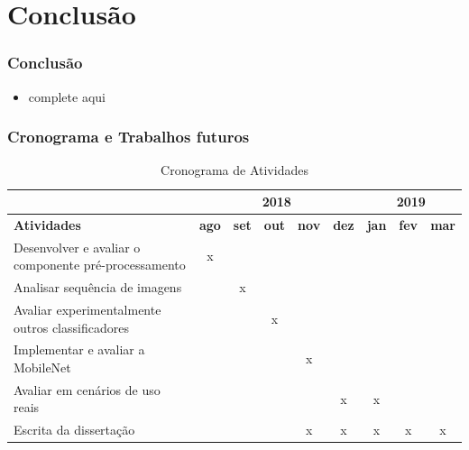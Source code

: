\documentclass{beamer}
\begin{document}


\section{Conclusão}

\begin{frame}
\frametitle{Conclusão}
\begin{itemize}
\pause
\item complete aqui
\end{itemize}
\end{frame}


\begin{frame}
 \frametitle{Cronograma e Trabalhos futuros}
 \pause
 \begin{table}[]\footnotesize
\caption{Cronograma de Atividades}
\label{table:cronog}
\begin{tabular}{l|ccccc|ccc|}
\cline{2-9}
                                                                           & \multicolumn{5}{c|}{\textbf{2018}}                                       & \multicolumn{3}{c|}{\textbf{2019}}         \\ \hline
\multicolumn{1}{|l|}{\textbf{Atividades}}                                  & \textbf{ago} & \textbf{set} & \textbf{out} & \textbf{nov} & \textbf{dez} & \textbf{jan} & \textbf{fev} & \textbf{mar} \\ \hline
\multicolumn{1}{|l|}{Desenvolver e avaliar o componente pré-processamento} & x            &              &              &              &              &              &              &              \\
\multicolumn{1}{|l|}{Analisar sequência de imagens}                        &              & x            &              &              &              &              &              &              \\
\multicolumn{1}{|l|}{Avaliar experimentalmente outros classificadores}     &              &              & x            &              &              &              &              &              \\
\multicolumn{1}{|l|}{Implementar e avaliar a MobileNet}                    &              &              &              & x            &              &              &              &              \\
\multicolumn{1}{|l|}{Avaliar em cenários de uso reais}                     &              &              &              &              & x            & x            &              &              \\
\multicolumn{1}{|l|}{Escrita da dissertação}                                  &              &              &              & x            & x            & x            & x            & x            \\ \hline
\end{tabular}
\end{table}
\end{frame}
\end{document}
